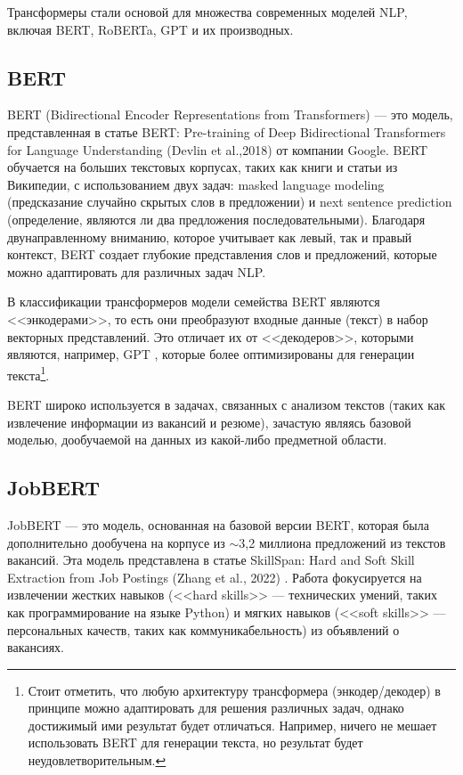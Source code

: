 \documentclass[14pt]{mmcs_article}
\begin{document}
Трансформеры стали основой для множества современных моделей NLP, включая BERT, RoBERTa, GPT и их производных.

\subsection*{BERT}\label{bert}

BERT (Bidirectional Encoder Representations from Transformers) --- это модель, представленная в статье BERT: Pre-training of Deep Bidirectional Transformers for Language Understanding (Devlin et al.,2018) \cite{devlin2019bertpretrainingdeepbidirectional} от компании Google. BERT обучается на больших текстовых корпусах, таких как книги и статьи из Википедии, с использованием двух задач: masked language modeling (предсказание случайно скрытых слов в предложении) и next sentence prediction (определение, являются ли два предложения последовательными). Благодаря двунаправленному вниманию, которое учитывает как левый, так и правый контекст, BERT создает глубокие представления слов и предложений, которые можно адаптировать для различных задач NLP.

В классификации трансформеров модели семейства BERT являются <<энкодерами>>, то есть они преобразуют входные данные (текст) в набор векторных представлений. Это отличает их от <<декодеров>>, которыми являются, например, GPT \cite{radford2018improving}, которые более оптимизированы для генерации текста\footnote{Стоит отметить, что любую архитектуру трансформера (энкодер/декодер) в принципе можно адаптировать для решения различных задач, однако достижимый ими результат будет отличаться. Например, ничего не мешает использовать BERT для генерации текста, но результат будет неудовлетворительным.}.

BERT широко используется в задачах, связанных с анализом текстов (таких как извлечение информации из вакансий и резюме), зачастую являясь базовой моделью, дообучаемой на данных из какой-либо предметной области.

\subsection*{JobBERT}\label{jobbert}

JobBERT --- это модель, основанная на базовой версии BERT, которая была дополнительно дообучена на корпусе из $\sim$3,2 миллиона предложений из текстов вакансий. Эта модель представлена в статье SkillSpan: Hard and Soft Skill Extraction from Job Postings (Zhang et al., 2022) \cite{zhang-etal-2022-skillspan}. Работа фокусируется на извлечении жестких навыков (<<hard skills>> --- технических умений, таких как программирование на языке Python) и мягких навыков (<<soft skills>> --- персональных качеств, таких как коммуникабельность) из объявлений о вакансиях.
\end{document}
